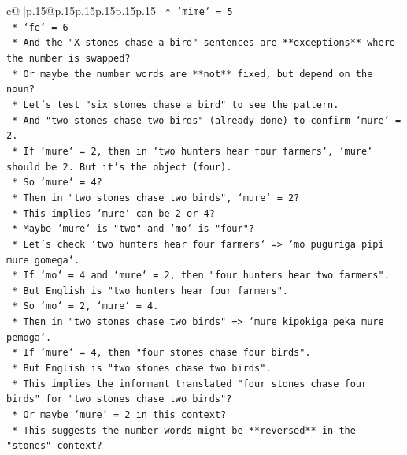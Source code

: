 \documentclass{article}
\begin{document}
{\begin{supertabular}{c@{$\;$}|p{.15\linewidth}@{}p{.15\linewidth}p{.15\linewidth}p{.15\linewidth}p{.15\linewidth}p{.15\linewidth}}
{{{\texttt{                    *   `mime` = 5} \\
\texttt{                    *   `fe` = 6} \\
\texttt{                *   And the "X stones chase a bird" sentences are **exceptions** where the number is swapped?} \\
\texttt{                *   Or maybe the number words are **not** fixed, but depend on the noun?} \\
\texttt{                *   Let's test "six stones chase a bird" to see the pattern.} \\
\texttt{                *   And "two stones chase two birds" (already done) to confirm `mure` = 2.} \\
\texttt{                *   If `mure` = 2, then in `two hunters hear four farmers`, `mure` should be 2. But it's the object (four).} \\
\texttt{                *   So `mure` = 4?} \\
\texttt{                *   Then in "two stones chase two birds", `mure` = 2?} \\
\texttt{                *   This implies `mure` can be 2 or 4?} \\
\texttt{                *   Maybe `mure` is "two" and `mo` is "four"?} \\
\texttt{                *   Let's check `two hunters hear four farmers` => `mo puguriga pipi mure gomega`.} \\
\texttt{                    *   If `mo` = 4 and `mure` = 2, then "four hunters hear two farmers".} \\
\texttt{                    *   But English is "two hunters hear four farmers".} \\
\texttt{                    *   So `mo` = 2, `mure` = 4.} \\
\texttt{                *   Then in "two stones chase two birds" => `mure kipokiga peka mure pemoga`.} \\
\texttt{                    *   If `mure` = 4, then "four stones chase four birds".} \\
\texttt{                    *   But English is "two stones chase two birds".} \\
\texttt{                    *   This implies the informant translated "four stones chase four birds" for "two stones chase two birds"?} \\
\texttt{                    *   Or maybe `mure` = 2 in this context?} \\
\texttt{                *   This suggests the number words might be **reversed** in the "stones" context?} \\
}}}
\end{supertabular}}
\end{document}
